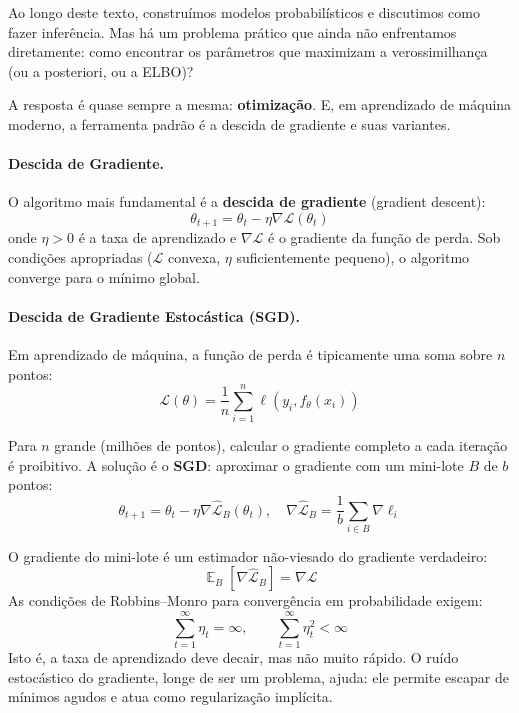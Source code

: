 \documentclass{tufte-handout}
\DeclareMathOperator{\E}{\mathbb{E}}
\begin{document}
Ao longo deste texto, construímos modelos probabilísticos e discutimos como fazer
inferência. Mas há um problema prático que ainda não enfrentamos diretamente: como
encontrar os parâmetros que maximizam a verossimilhança (ou a posteriori, ou a ELBO)?

A resposta é quase sempre a mesma: \textbf{otimização}. E, em aprendizado de máquina
moderno, a ferramenta padrão é a descida de gradiente e suas variantes.

\paragraph{Descida de Gradiente.}

O algoritmo mais fundamental é a \textbf{descida de gradiente} (gradient descent):
\[
\theta_{t+1} = \theta_t - \eta \nabla \mathcal{L}(\theta_t)
\]
onde $\eta > 0$ é a taxa de aprendizado e $\nabla\mathcal{L}$ é o gradiente da função
de perda. Sob condições apropriadas ($\mathcal{L}$ convexa, $\eta$ suficientemente
pequeno), o algoritmo converge para o mínimo global.

\paragraph{Descida de Gradiente Estocástica (SGD).}

Em aprendizado de máquina, a função de perda é tipicamente uma soma sobre $n$ pontos:
\[
\mathcal{L}(\theta) = \frac{1}{n} \sum_{i=1}^n \ell(y_i, f_\theta(x_i))
\]

Para $n$ grande (milhões de pontos), calcular o gradiente completo a cada iteração
é proibitivo. A solução é o \textbf{SGD}: aproximar o gradiente com um mini-lote
$B$ de $b$ pontos:
\[
\theta_{t+1} = \theta_t - \eta \nabla \hat{\mathcal{L}}_B(\theta_t), \quad
\nabla \hat{\mathcal{L}}_B = \frac{1}{b} \sum_{i \in B} \nabla \ell_i
\]

\begin{remark}
    O gradiente do mini-lote é um estimador não-viesado do gradiente verdadeiro:
    \[
    \E_B[\nabla \hat{\mathcal{L}}_B] = \nabla \mathcal{L}
    \]
    As condições de Robbins--Monro para convergência em probabilidade exigem:
    \[
    \sum_{t=1}^\infty \eta_t = \infty, \qquad \sum_{t=1}^\infty \eta_t^2 < \infty
    \]
    Isto é, a taxa de aprendizado deve decair, mas não muito rápido.
    O ruído estocástico do gradiente, longe de ser um problema, ajuda: ele permite
    escapar de mínimos agudos e atua como regularização implícita.
\end{remark}
\end{document}
